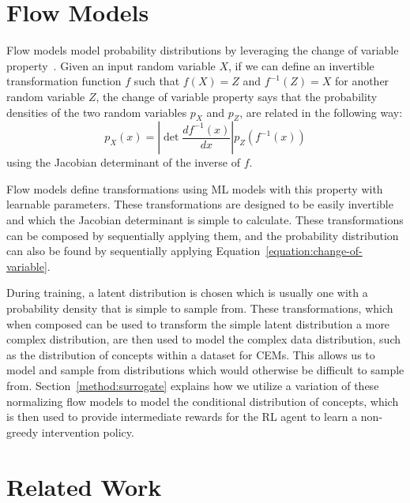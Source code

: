 \section{Flow Models}\label{background:flow}
Flow models model probability distributions by leveraging the change of variable property~\cite{normalizing-flows}.
Given an input random variable $X$,
if we can define an invertible transformation function $f$ such that
$f(X) = Z$ and $f^{-1}(Z) = X$ for another random variable $Z$,
the change of variable property says that 
the probability densities of the two random variables $p_X$ and $p_Z$,
are related in the following way:
\begin{equation}\label{equation:change-of-variable}
p_X(x) = \left | \mathop{\mathrm{det}} \frac{d f^{-1}(x)}{d x}
\right | p_Z(f^{-1}(x))
\end{equation}
using the Jacobian determinant of the inverse of $f$.

Flow models define transformations
using ML models with this property with learnable parameters.
These transformations are designed to be easily invertible
and which the Jacobian determinant is simple to calculate.
These transformations can be composed by sequentially applying them,
and the probability distribution can also be found by sequentially
applying Equation~\ref{equation:change-of-variable}.

During training, a latent distribution is chosen
which is usually one with a 
probability density that is simple to sample from.
These transformations, which when composed can be used to 
transform the simple latent distribution a more complex distribution,
are then used to model the complex data distribution, such as 
the distribution of concepts within a dataset for CEMs. This allows 
us to model and sample from distributions which would otherwise 
be difficult to sample from.
Section~\ref{method:surrogate} explains how we utilize a variation of 
these normalizing flow models to model the conditional distribution of concepts,
which is then used to provide intermediate rewards for the RL agent 
to learn a non-greedy intervention policy.

\section{Related Work}

